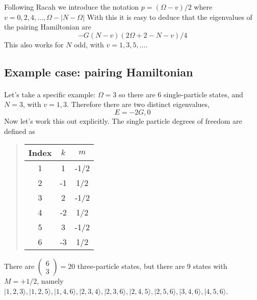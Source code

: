 \documentclass[%
twoside,                 %
final,                   %
10pt]{article}
\begin{document}
Following Racah we introduce the notation
$p = (\Omega - v)/2$
where $v = 0, 2, 4,..., \Omega - |N-\Omega|$ 
With this it is easy to deduce that the eigenvalues of the pairing Hamiltonian are
\[
-G(N-v)(2\Omega +2-N-v)/4
\]
This also works for $N$ odd, with $v= 1,3,5, \dots$.




\subsection*{Example case: pairing Hamiltonian}

\paragraph{}

Let's take a specific example: $\Omega = 3$ so there are 6 single-particle states, 
and $N = 3$, with $v= 1,3$. Therefore there are two distinct eigenvalues, 
\[
E = -2G, 0
\]
Now let's work this out explicitly. The single particle degrees of freedom are defined as


\begin{quote}
\begin{tabular}{ccc}
\hline
\multicolumn{1}{c}{ Index } & \multicolumn{1}{c}{ $k$ } & \multicolumn{1}{c}{ $m$ } \\
\hline
1     & 1   & -1/2 \\
2     & -1  & 1/2  \\
3     & 2   & -1/2 \\
4     & -2  & 1/2  \\
5     & 3   & -1/2 \\
6     & -3  & 1/2  \\
\hline
\end{tabular}
\end{quote}

\noindent
 There are  $\left( \begin{array}{c}6 \\ 3 \end{array} \right) = 20$ three-particle states, but there 
are 9 states with $M = +1/2$, namely
$| 1,2,3 \rangle, |1,2,5\rangle, | 1,4,6 \rangle, | 2,3,4 \rangle, |2,3,6 \rangle, | 2,4,5 \rangle, | 2, 5, 6 \rangle, |3,4,6 \rangle, | 4,5,6 \rangle$.
\end{document}
